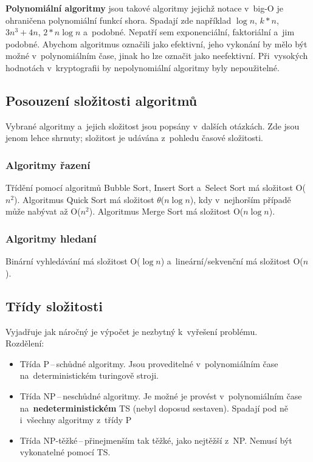 \textbf{Polynomiální algoritmy} jsou takové algoritmy jejichž notace v~big-O je ohraničena polynomiální funkcí shora. Spadají zde například $\log{n}$, $k*n$, $3n^3 + 4n$, $2*n\log{n}$ a~podobné. Nepatří sem exponenciální, faktoriální a~jim podobné. Abychom algoritmus označili jako efektivní, jeho vykonání by mělo být možné v~polynomiálním čase, jinak ho lze označit jako neefektivní. Při~vysokých hodnotách v~kryptografii by nepolynomiální algoritmy byly nepoužitelné.

\subsection{Posouzení složitosti algoritmů}

Vybrané algoritmy a~jejich složitost jsou popsány v~dalších otázkách. Zde jsou jenom lehce shrnuty; složitost je udávána z~pohledu časové složitosti.

\subsubsection{Algoritmy řazení}

Třídění pomocí algoritmů Bubble Sort, Insert Sort a~Select Sort má složitost O($n^2$). Algoritmus Quick Sort má složitost $\theta$($n\log{n}$), kdy v~nejhorším případě může nabývat až O($n^2$). Algoritmus Merge Sort má složitost O($n\log{n}$).

\subsubsection{Algoritmy hledaní}

Binární vyhledávání má složitost O($\log{n}$) a~lineární/sekvenční má složitost O($n$).

\subsection{Třídy složitosti}

Vyjadřuje jak náročný je výpočet je nezbytný k~vyřešení problému. \\
Rozdělení:
\begin{itemize}[noitemsep]
	\item Třída P\,--\,schůdné algoritmy. Jsou proveditelné v~polynomiálním čase na~deterministickém turingově stroji.
	\item Třída NP\,--\,neschůdné algoritmy. Je možné je provést v~polynomiálním čase na~\textbf{nedeterministickém} TS (nebyl doposud sestaven). Spadají pod ně i~všechny algoritmy z~třídy P
	\item Třída NP-těžké\,--\,přinejmenším tak těžké, jako nejtěžší z~NP. Nemusí být vykonatelné pomocí TS.
\end{itemize}

